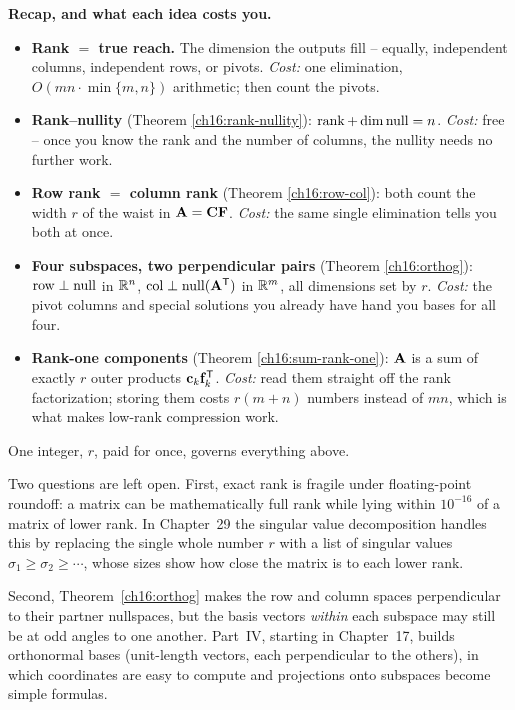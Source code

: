 \begin{recoverybox}
\textbf{Recap, and what each idea costs you.}
\begin{itemize}
  \item \textbf{Rank $=$ true reach.} The dimension the outputs fill -- equally,
        independent columns, independent rows, or pivots. \emph{Cost:} one
        elimination, $O(mn\cdot\min\{m,n\})$ arithmetic; then count the pivots.
  \item \textbf{Rank--nullity} (Theorem \ref{ch16:rank-nullity}):
        $\operatorname{rank} + \operatorname{dim}\operatorname{null} = n$. \emph{Cost:} free -- once you know the rank and
        the number of columns, the nullity needs no further work.
  \item \textbf{Row rank $=$ column rank} (Theorem \ref{ch16:row-col}): both count
        the width $r$ of the waist in $\mathbf{A}=\mathbf{C}\mathbf{F}$. \emph{Cost:} the
        same single elimination tells you both at once.
  \item \textbf{Four subspaces, two perpendicular pairs} (Theorem
        \ref{ch16:orthog}): $\operatorname{row}\perp\operatorname{null}$ in $\mathbb{R}^n$,
        $\operatorname{col}\perp\operatorname{null}(\mathbf{A}^{\mathsf{T}})$ in $\mathbb{R}^m$, all dimensions set by $r$.
        \emph{Cost:} the pivot columns and special solutions you already have hand
        you bases for all four.
  \item \textbf{Rank-one components} (Theorem \ref{ch16:sum-rank-one}): $\mathbf{A}$ is a
        sum of exactly $r$ outer products $\mathbf{c}_k\mathbf{f}_k^{\mathsf{T}}$. \emph{Cost:} read
        them straight off the rank factorization; storing them costs $r(m+n)$
        numbers instead of $mn$, which is what makes low-rank compression work.
\end{itemize}
One integer, $r$, paid for once, governs everything above.
\end{recoverybox}

\begin{connectionbox}
Two questions are left open. First, exact rank is fragile under floating-point
roundoff: a matrix can be mathematically full rank while lying within
$10^{-16}$ of a matrix of lower rank. In Chapter~29 the singular value
decomposition handles this by replacing the single whole number $r$ with a list
of singular values $\sigma_1 \ge \sigma_2 \ge \cdots$, whose sizes show how
close the matrix is to each lower rank.

Second, Theorem~\ref{ch16:orthog} makes the row and column spaces perpendicular
to their partner nullspaces, but the basis vectors \emph{within} each subspace
may still be at odd angles to one another. Part~IV, starting in Chapter~17,
builds orthonormal bases (unit-length vectors, each perpendicular to the
others), in which coordinates are easy to compute and projections onto
subspaces become simple formulas.
\end{connectionbox}

